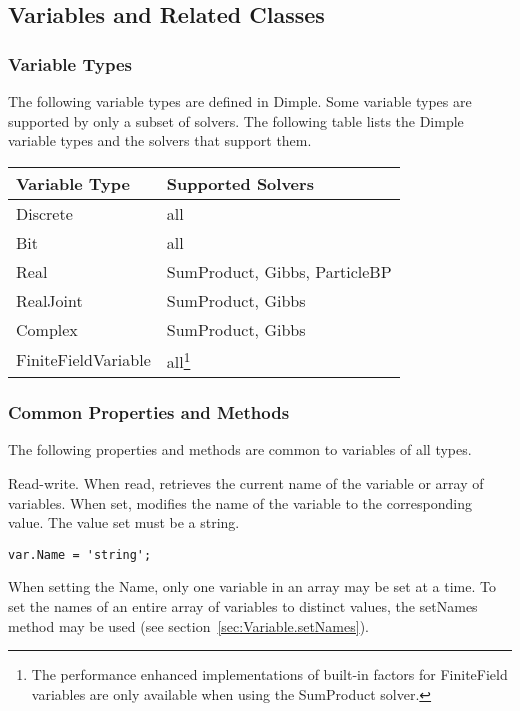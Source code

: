 \subsection{Variables and Related Classes}

\subsubsection{Variable Types}

The following variable types are defined in Dimple.  Some variable types are supported by only a subset of solvers.  The following table lists the Dimple variable types and the solvers that support them.

\begin{longtable} {l | p{7cm}}
Variable Type & Supported Solvers \\
\hline
\endhead
Discrete & all \\
Bit & all \\
Real & SumProduct, Gibbs, ParticleBP \\
RealJoint & SumProduct, Gibbs \\ 
Complex & SumProduct, Gibbs \\
FiniteFieldVariable & all\footnote{The performance enhanced implementations of built-in factors for FiniteField variables are only available when using the SumProduct solver.} \\
\end{longtable} 

\subsubsection{Common Properties and Methods}

The following properties and methods are common to variables of all types.



Read-write.  When read, retrieves the current name of the variable or array of variables.  When set, modifies the name of the variable to the corresponding value.  The value set must be a string.

\ifmatlab
\begin{lstlisting}
var.Name = 'string';
\end{lstlisting}

When setting the Name, only one variable in an array may be set at a time.  To set the names of an entire array of variables to distinct values, the setNames method may be used (see section~\ref{sec:Variable.setNames}).

